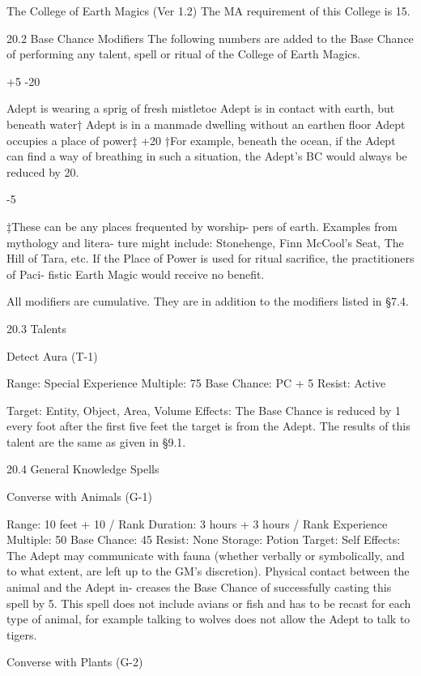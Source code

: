 \begin{Chapter}{The College of Earth Magics (Ver 1.2)}
The MA requirement of this College is 15. 

20.2 Base Chance Modifiers 
The  following  numbers  are  added  to  the  Base 
Chance  of  performing  any  talent,  spell  or  ritual  of 
the College of Earth Magics. 

+5 
-20 

Adept is wearing a sprig of fresh mistletoe 
Adept is in contact with earth, but beneath 
water† 
Adept is in a manmade dwelling without an 
earthen floor 
Adept occupies a place of power‡ 
+20 
†For example, beneath the ocean, if the Adept can 
find  a  way  of  breathing  in  such  a  situation,  the 
Adept’s BC would always be reduced by 20. 

-5 

‡These  can  be  any  places  frequented  by  worship-
pers of earth. Examples from mythology and litera-
ture  might  include:  Stonehenge,  Finn  McCool’s 
Seat, The Hill of Tara, etc. If the Place of Power is 
used  for  ritual  sacrifice,  the  practitioners  of  Paci-
fistic Earth Magic would receive no benefit. 

All modifiers are cumulative. They are in addition 
to the modifiers listed in §7.4. 

20.3 Talents  

Detect Aura (T-1)  

Range: Special 
Experience Multiple: 75 
Base Chance: PC + 5%
Resist: Active 

Target: Entity, Object, Area, Volume 
Effects:  The  Base  Chance  is  reduced  by  1%
every foot after the first five feet the target is from 
the Adept. The results of this talent are the same as 
given in §9.1. 

20.4 General Knowledge Spells 

Converse with Animals (G-1) 

Range: 10 feet + 10 / Rank 
Duration: 3 hours + 3 hours / Rank 
Experience Multiple: 50 
Base Chance: 45%
Resist: None 
Storage: Potion 
Target: Self 
Effects:  The  Adept  may  communicate  with  fauna 
(whether  verbally  or  symbolically,  and  to  what 
extent, are left up to the GM’s discretion). Physical 
contact  between  the  animal  and  the  Adept  in-
creases  the  Base  Chance  of  successfully  casting 
this  spell  by  5.  This  spell  does  not  include  avians 
or fish and has to be recast for each type of animal, 
for  example  talking  to  wolves  does  not  allow  the 
Adept to talk to tigers. 

Converse with Plants (G-2) 


\end{Chapter}

